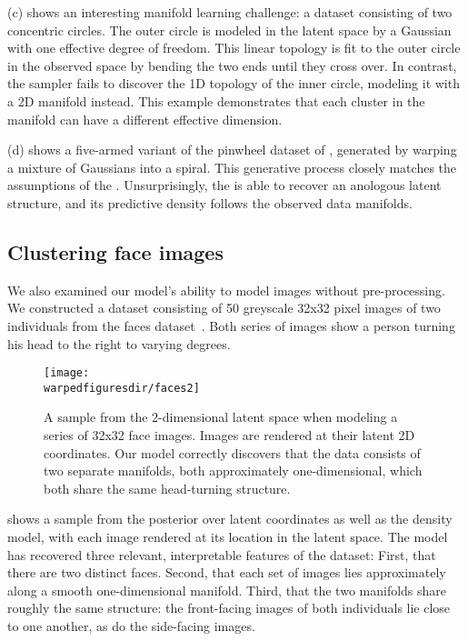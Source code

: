 (c) shows an interesting manifold learning challenge: a dataset consisting of two concentric circles.
The outer circle is modeled in the latent space by a Gaussian with one effective degree of freedom.
This linear topology is fit to the outer circle in the observed space by bending the two ends until they cross over.
In contrast, the sampler fails to discover the 1D topology of the inner circle, modeling it with a 2D manifold instead.
This example demonstrates that each cluster in the \iwmm{} manifold can have a different effective dimension.

(d) shows a five-armed variant of the pinwheel dataset of \citet{adams2009archipelago}, generated by warping a mixture of Gaussians into a spiral.
This generative process closely matches the assumptions of the \iwmm{}.
Unsurprisingly, the \iwmm{} is able to recover an anologous latent structure, and its predictive density follows the observed data manifolds.





\subsection{Clustering face images}

We also examined our model's ability to model images without pre-processing.
We constructed a dataset consisting of 50 greyscale 32x32 pixel images of two individuals from the \UMIST{} faces dataset~\citep{umistfaces}.
Both series of images show a person turning his head to the right to varying degrees.

\begin{figure}[h!]
\centering
\texttt{[image: \\warpedfiguresdir/faces2]}
\caption[Latent clusters of face images]{A sample from the 2-dimensional latent space when modeling a series of 32x32 face images.
Images are rendered at their latent 2D coordinates.
Our model correctly discovers that the data consists of two separate manifolds, both approximately one-dimensional, which both share the same head-turning structure.}
\label{fig:faces}
\end{figure}

 shows a sample from the posterior over latent coordinates as well as the density model, with each image rendered at its location in the latent space.
The model has recovered three relevant, interpretable features of the dataset:
First, that there are two distinct faces.
Second, that each set of images lies approximately along a smooth one-dimensional manifold.
Third, that the two manifolds share roughly the same structure: the front-facing images of both individuals lie close to one another, as do the side-facing images.







